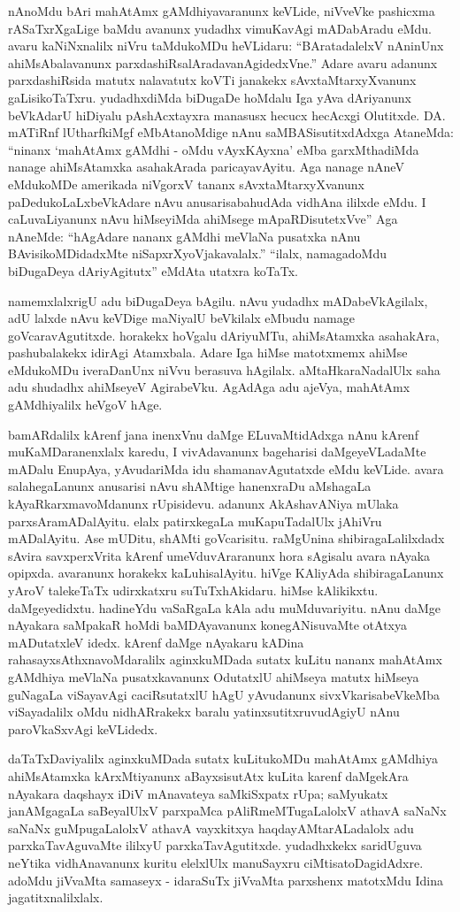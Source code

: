 nAnoMdu bAri mahAtAmx gAMdhiyavaranunx keVLide, niVveVke pashicxma rASaTxrXgaLige baMdu avanunx yudadhx vimuKavAgi mADabAradu eMdu. avaru kaNiNxnalilx niVru taMdukoMDu heVLidaru: ``BAratadalelxV nAninUnx ahiMsAbalavanunx parxdashiRsalAradavanAgidedxVne.'' Adare avaru adanunx parxdashiRsida matutx nalavatutx koVTi janakekx sAvxtaMtarxyXvanunx gaLisikoTaTxru. yudadhxdiMda biDugaDe hoMdalu Iga yAva dAriyanunx beVkAdarU hiDiyalu pAshAcxtayxra manasusx hecucx hecAcxgi Olutitxde. DA. mATiRnf lUtharfkiMgf eMbAtanoMdige nAnu saMBASisutitxdAdxga AtaneMda: ``ninanx `mahAtAmx gAMdhi - oMdu vAyxKAyxna' eMba garxMthadiMda nanage ahiMsAtamxka asahakArada paricayavAyitu. Aga nanage nAneV eMdukoMDe amerikada niVgorxV tananx sAvxtaMtarxyXvanunx paDedukoLaLxbeVkAdare nAvu anusarisabahudAda vidhAna ililxde eMdu. I caLuvaLiyanunx nAvu hiMseyiMda ahiMsege mApaRDisutetxVve'' Aga nAneMde: ``hAgAdare nananx gAMdhi meVlaNa pusatxka nAnu BAvisikoMDidadxMte niSapxrXyoVjakavalalx.'' ``ilalx, namagadoMdu biDugaDeya dAriyAgitutx'' eMdAta utatxra koTaTx.

namemxlalxrigU adu biDugaDeya bAgilu. nAvu yudadhx mADabeVkAgilalx, adU lalxde nAvu keVDige maNiyalU beVkilalx eMbudu namage goVcaravAgutitxde. horakekx hoVgalu dAriyuMTu, ahiMsAtamxka asahakAra, pashubalakekx idirAgi Atamxbala. Adare Iga hiMse matotxmemx ahiMse eMdukoMDu iveraDanUnx niVvu berasuva hAgilalx. aMtaHkaraNadalUlx saha adu shudadhx ahiMseyeV AgirabeVku. AgAdAga adu ajeVya, mahAtAmx gAMdhiyalilx heVgoV hAge. 

bamARdalilx kArenf jana inenxVnu daMge ELuvaMtidAdxga nAnu kArenf muKaMDaranenxlalx karedu, I vivAdavanunx bageharisi daMgeyeVLadaMte mADalu EnupAya, yAvudariMda idu shamanavAgutatxde eMdu keVLide. avara salahegaLanunx anusarisi nAvu shAMtige hanenxraDu aMshagaLa kAyaRkarxmavoMdanunx rUpisidevu. adanunx AkAshavANiya mUlaka parxsAramADalAyitu. elalx patirxkegaLa muKapuTadalUlx jAhiVru mADalAyitu. Ase mUDitu, shAMti goVcarisitu. raMgUnina shibiragaLalilxdadx sAvira savxperxVrita kArenf umeVduvAraranunx hora sAgisalu avara nAyaka opipxda. avaranunx horakekx kaLuhisalAyitu. hiVge KAliyAda shibiragaLanunx yAroV talekeTaTx udirxkatxru suTuTxhAkidaru. hiMse kAlikikxtu. daMgeyedidxtu. hadineYdu vaSaRgaLa kAla adu muMduvariyitu. nAnu daMge nAyakara saMpakaR hoMdi baMDAyavanunx konegANisuvaMte otAtxya mADutatxleV idedx. kArenf daMge nAyakaru kADina rahasayxsAthxnavoMdaralilx aginxkuMDada sutatx kuLitu nananx mahAtAmx gAMdhiya meVlaNa pusatxkavanunx OdutatxlU ahiMseya matutx hiMseya guNagaLa viSayavAgi caciRsutatxlU hAgU yAvudanunx  sivxVkarisabeVkeMba viSayadalilx oMdu nidhARrakekx baralu yatinxsutitxruvudAgiyU nAnu paroVkaSxvAgi keVLidedx.

daTaTxDaviyalilx aginxkuMDada sutatx kuLitukoMDu mahAtAmx gAMdhiya ahiMsAtamxka kArxMtiyanunx aBayxsisutAtx kuLita karenf daMgekAra nAyakara daqshayx iDiV mAnavateya saMkiSxpatx rUpa; saMyukatx janAMgagaLa saBeyalUlxV parxpaMca pAliRmeMTugaLalolxV athavA saNaNx saNaNx guMpugaLalolxV athavA vayxkitxya haqdayAMtarALadalolx adu parxkaTavAguvaMte ililxyU parxkaTavAgutitxde. yudadhxkekx saridUguva neYtika vidhAnavanunx kuritu elelxlUlx manuSayxru ciMtisatoDagidAdxre. adoMdu jiVvaMta samaseyx - idaraSuTx jiVvaMta parxshenx matotxMdu Idina jagatitxnalilxlalx.


